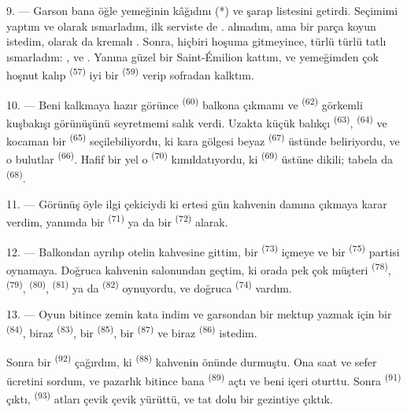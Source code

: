 9. --- Garson bana öğle yemeğinin kâğıdını (*) ve şarap listesini getirdi.
Seçimimi yaptım ve  olarak 
 ısmarladım, ilk serviste de .  almadım, ama bir parça koyun  istedim,
 olarak da kremalı . Sonra,  hiçbiri hoşuma gitmeyince, türlü türlü tatlı ısmarladım:
,  ve . Yanına güzel bir
Saint-Émilion  kattım, ve yemeğimden çok hoşnut kalıp
 \textsuperscript{(57)} iyi bir 
\textsuperscript{(59)} verip sofradan kalktım.

10. --- Beni kalkmaya hazır görünce  \textsuperscript{(60)}
balkona çıkmamı ve  \textsuperscript{(62)} görkemli
kuşbakışı görünüşünü seyretmemi salık verdi. Uzakta küçük balıkçı
 \textsuperscript{(63)}, 
\textsuperscript{(64)} ve kocaman bir 
\textsuperscript{(65)} seçilebiliyordu, ki kara gölgesi beyaz  \textsuperscript{(67)} üstünde
beliriyordu, ve o bulutlar  \textsuperscript{(66)}.
Hafif bir yel o  \textsuperscript{(70)} kımıldatıyordu, ki
 \textsuperscript{(69)} üstüne dikili; tabela da
 \textsuperscript{(68)}.

\VUsaut{3.0mm}
\VUsaut{3.0mm}

11. --- Görünüş öyle ilgi çekiciydi ki ertesi gün kahvenin damına çıkmaya karar
verdim, yanımda bir  \textsuperscript{(71)} ya da bir
 \textsuperscript{(72)} alarak.

12. --- Balkondan ayrılıp otelin kahvesine gittim, bir 
\textsuperscript{(73)} içmeye ve bir  \textsuperscript{(75)}
partisi oynamaya. Doğruca kahvenin salonundan geçtim, ki orada pek çok müşteri
 \textsuperscript{(78)},  \textsuperscript{(79)},
 \textsuperscript{(80)},  \textsuperscript{(81)}
ya da  \textsuperscript{(82)} oynuyordu, ve doğruca
 \textsuperscript{(74)} vardım.

13. --- Oyun bitince zemin kata indim ve garsondan bir mektup yazmak için bir
 \textsuperscript{(84)}, biraz 
\textsuperscript{(83)}, bir  \textsuperscript{(85)}, bir
 \textsuperscript{(87)} ve biraz 
\textsuperscript{(86)} istedim.

Sonra bir  \textsuperscript{(92)} çağırdım, ki
 \textsuperscript{(88)} kahvenin önünde durmuştu. Ona saat ve
sefer ücretini sordum, ve pazarlık bitince bana 
\textsuperscript{(89)} açtı ve beni içeri oturttu. Sonra 
\textsuperscript{(91)} çıktı,  \textsuperscript{(93)}
atları çevik çevik yürüttü, ve tat dolu bir gezintiye çıktık.
\VUsaut{6.0mm}
\VUfilet{22mm}
